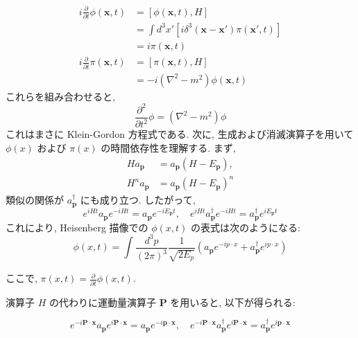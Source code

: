 \documentclass[a4paper,12pt]{article}
\begin{document}
\begin{align*}
i \frac{\partial}{\partial t} \phi(\mathbf{x}, t) &= \left[ \phi(\mathbf{x}, t), H \right] \\
&= \int d^3 x' \left[ i \delta^3(\mathbf{x} - \mathbf{x}') \pi(\mathbf{x}', t) \right] \\
&= i \pi(\mathbf{x}, t) \\
i \frac{\partial}{\partial t} \pi(\mathbf{x}, t) &= \left[ \pi(\mathbf{x}, t), H \right] \\
&= -i (\nabla^2 - m^2) \phi(\mathbf{x}, t)
\end{align*}
これらを組み合わせると, 
\begin{equation*}
\frac{\partial^2}{\partial t^2} \phi = (\nabla^2 - m^2) \phi \tag{2.45}
\end{equation*}
これはまさに Klein-Gordon 方程式である.
\bigskip
次に, 生成および消滅演算子を用いて $\phi(x)$ および $\pi(x)$ の時間依存性を理解する. まず,
\begin{align*}
H a_{\mathbf{p}} &= a_{\mathbf{p}} (H - E_{\mathbf{p}}), \\
H^n a_{\mathbf{p}} &= a_{\mathbf{p}} (H - E_{\mathbf{p}})^n
\end{align*}
類似の関係が $a_{\mathbf{p}}^\dagger$ にも成り立つ. したがって,
\begin{equation*}
e^{iHt} a_{\mathbf{p}} e^{-iHt} = a_{\mathbf{p}} e^{-iE_{\mathbf{p}} t}, \quad
e^{iHt} a_{\mathbf{p}}^\dagger e^{-iHt} = a_{\mathbf{p}}^\dagger e^{iE_{\mathbf{p}} t} \tag{2.46}
\end{equation*}
これにより, Heisenberg 描像での $\phi(x, t)$ の表式は次のようになる:
\begin{equation*}
\phi(x, t) = \int \frac{d^3 p}{(2\pi)^3} \frac{1}{\sqrt{2 E_p}} \left( a_{\mathbf{p}} e^{-i p \cdot x} + a_{\mathbf{p}}^\dagger e^{i p \cdot x} \right) \tag{2.47}
\end{equation*}

ここで, $\pi(x, t) = \frac{\partial}{\partial t} \phi(x, t)$.

\bigskip

演算子 $H$ の代わりに運動量演算子 $\mathbf{P}$ を用いると, 以下が得られる:

\begin{equation*}
e^{-i \mathbf{P} \cdot \mathbf{x}} a_{\mathbf{p}} e^{i \mathbf{P} \cdot \mathbf{x}} = a_{\mathbf{p}} e^{-i \mathbf{p} \cdot \mathbf{x}}, \quad
e^{-i \mathbf{P} \cdot \mathbf{x}} a_{\mathbf{p}}^\dagger e^{i \mathbf{P} \cdot \mathbf{x}} = a_{\mathbf{p}}^\dagger e^{i \mathbf{p} \cdot \mathbf{x}} \tag{2.48}
\end{equation*}
\end{document}
